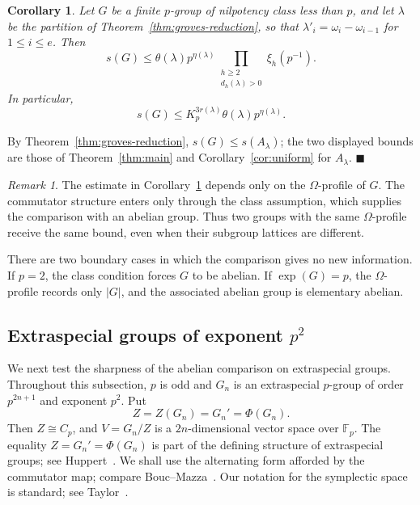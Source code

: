 \documentclass[a4paper,11pt,reqno]{amsart}
\theoremstyle{plain}
\newtheorem{corollary}[theorem]{Corollary}
\theoremstyle{remark}
\newtheorem{remark}[theorem]{Remark}
\numberwithin{equation}{section}
\newcommand{\card}[1]{\left\lvert #1\right\rvert}
\renewcommand{\leq}{\leqslant}
\renewcommand{\geq}{\geqslant}
\newenvironment{proofof}{{\bf Proof. }}{\hfill $\blacksquare$ \\}
\begin{document}
\begin{corollary}\label{cor:omega-profile-bound}
Let $G$ be a finite $p$-group of nilpotency class less than $p$, and let
$\lambda$ be the partition of Theorem~\ref{thm:groves-reduction}, so that
$\lambda'_i=\omega_i-\omega_{i-1}$ for $1\leq i\leq e$. Then
\[
        s(G)
        \leq
        \theta(\lambda)p^{\eta(\lambda)}
        \prod_{\substack{h\geq 2\\ d_h(\lambda)>0}}\xi_h(p^{-1}).
\]
In particular,
\[
        s(G)
        \leq
        K_p^{3r(\lambda)}\theta(\lambda)p^{\eta(\lambda)}.
\]
\end{corollary}

\begin{proofof}
By Theorem~\ref{thm:groves-reduction}, $s(G)\leq s(A_\lambda)$; the two
displayed bounds are those of Theorem~\ref{thm:main} and
Corollary~\ref{cor:uniform} for $A_\lambda$.
\end{proofof}

\begin{remark}
The estimate in Corollary~\ref{cor:omega-profile-bound} depends only on the
$\Omega$-profile of $G$. The commutator structure enters only through the class
assumption, which supplies the comparison with an abelian group. Thus two groups
with the same $\Omega$-profile receive the same bound, even when their subgroup
lattices are different.

There are two boundary cases in which the comparison gives no new information.
If $p=2$, the class condition forces $G$ to be abelian. If $\exp(G)=p$, the
$\Omega$-profile records only $\card G$, and the associated abelian group is
elementary abelian.
\end{remark}

\subsection{Extraspecial groups of exponent \texorpdfstring{$p^2$}{p2}}

We next test the sharpness of the abelian comparison on extraspecial groups. Throughout this
subsection, $p$ is odd and $G_n$ is an extraspecial $p$-group of order
$p^{2n+1}$ and exponent $p^2$. Put
\[
        Z=Z(G_n)=G_n'=\Phi(G_n).
\]
Then $Z\cong C_p$, and $V=G_n/Z$ is a $2n$-dimensional vector space over
$\mathbb F_p$. The equality $Z=G_n'=\Phi(G_n)$ is part of the defining
structure of extraspecial groups; see Huppert~\cite[Kap.~III, \S 13,
Def.~13.1]{Huppert}. We shall use the alternating form afforded by the
commutator map; compare Bouc--Mazza~\cite[Sec.~2]{BoucMazza}. Our notation
for the symplectic space is standard; see Taylor~\cite[Chap.~8]{Taylor}.
\end{document}
